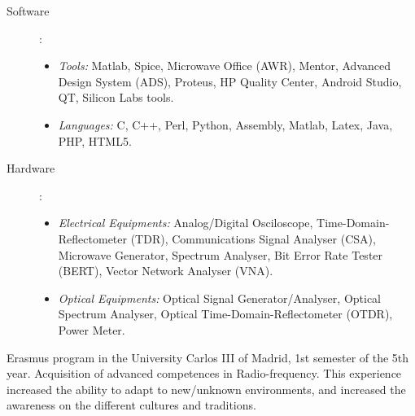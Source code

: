 \documentclass[helvetica,openbib,totpages]{europecv}
\begin{document}
\begin{europecv}
{
\begin{description}
	\item[Software]:
	\begin{itemize}
		\item \textit{Tools:} Matlab, Spice, Microwave Office (AWR), Mentor, Advanced Design System (ADS), Proteus, HP Quality Center, Android Studio, QT, Silicon Labs tools.
		\item \textit{Languages:} C, C++, Perl, Python, Assembly, Matlab, Latex, Java, PHP, HTML5.
	\end{itemize}
	\item[Hardware]:
	\begin{itemize}
		\item \textit{Electrical Equipments:} Analog/Digital Osciloscope, Time-Domain-Reflectometer (TDR), Communications Signal Analyser (CSA), Microwave Generator, Spectrum Analyser, Bit Error Rate Tester (BERT), Vector Network Analyser (VNA).
		\item \textit{Optical Equipments:} Optical Signal Generator/Analyser, Optical Spectrum Analyser, Optical Time-Domain-Reflectometer (OTDR), Power Meter.
	\end{itemize}
\end{description} 
}

{Erasmus program in the University Carlos III of Madrid, 1st semester of the 5th year. \newline
Acquisition of advanced competences in Radio-frequency. \newline
This experience increased the ability to adapt to new/unknown environments, and increased the awareness on the different cultures and traditions.
}

\end{europecv}
\end{document}
